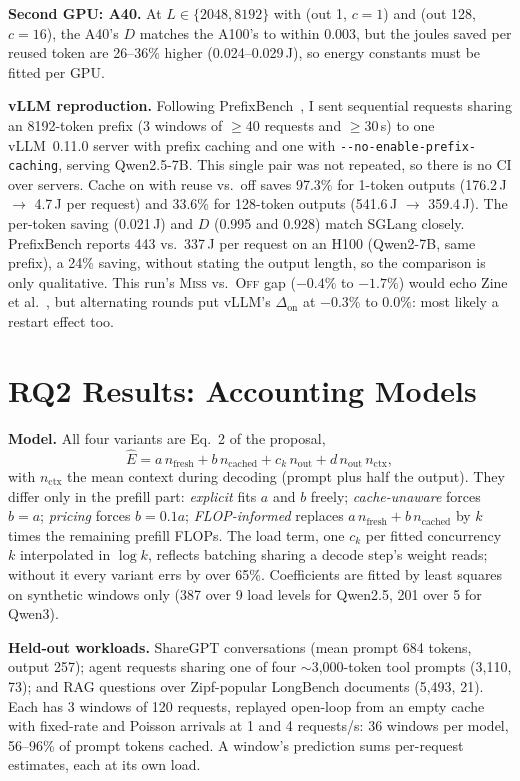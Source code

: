 \documentclass[conference]{IEEEtran}
\begin{document}
\textbf{Second GPU: A40.} At $L\in\{2048, 8192\}$ with (out 1, $c{=}1$) and (out 128, $c{=}16$), the A40's $D$ matches the A100's to within 0.003, but the joules saved per reused token are 26--36\% higher (0.024--0.029\,J), so energy constants must be fitted per GPU.

\textbf{vLLM reproduction.} Following PrefixBench~\cite{prefixbench}, I sent sequential requests sharing an 8192-token prefix (3 windows of $\ge$40 requests and $\ge$30\,s) to one vLLM~0.11.0 server with prefix caching and one with \texttt{-{}-no-enable-prefix-caching}, serving Qwen2.5-7B. This single pair was not repeated, so there is no CI over servers. Cache on with reuse vs.\ off saves 97.3\% for 1-token outputs (176.2\,J $\to$ 4.7\,J per request) and 33.6\% for 128-token outputs (541.6\,J $\to$ 359.4\,J). The per-token saving (0.021\,J) and $D$ (0.995 and 0.928) match SGLang closely. PrefixBench reports 443 vs.\ 337\,J per request on an H100 (Qwen2-7B, same prefix), a 24\% saving, without stating the output length, so the comparison is only qualitative. This run's \textsc{Miss} vs.\ \textsc{Off} gap ($-0.4\%$ to $-1.7\%$) would echo Zine et al.~\cite{zine}, but alternating rounds put vLLM's $\Delta_{\text{on}}$ at $-0.3\%$ to $0.0\%$: most likely a restart effect too.

\section{RQ2 Results: Accounting Models}
\label{sec:rq2}
\textbf{Model.} All four variants are Eq.~2 of the proposal,
\begin{equation}
\hat E = a\,n_{\text{fresh}} + b\,n_{\text{cached}} + c_k\,n_{\text{out}} + d\,n_{\text{out}}\,n_{\text{ctx}},
\end{equation}
with $n_{\text{ctx}}$ the mean context during decoding (prompt plus half the output). They differ only in the prefill part: \emph{explicit} fits $a$ and $b$ freely; \emph{cache-unaware} forces $b=a$; \emph{pricing} forces $b=0.1a$; \emph{FLOP-informed} replaces $a\,n_{\text{fresh}}+b\,n_{\text{cached}}$ by $k$ times the remaining prefill FLOPs. The load term, one $c_k$ per fitted concurrency $k$ interpolated in $\log k$, reflects batching sharing a decode step's weight reads; without it every variant errs by over 65\%. Coefficients are fitted by least squares on synthetic windows only (387 over 9 load levels for Qwen2.5, 201 over 5 for Qwen3).

\textbf{Held-out workloads.} ShareGPT conversations (mean prompt 684 tokens, output 257); agent requests sharing one of four $\sim$3{,}000-token tool prompts (3{,}110, 73); and RAG questions over Zipf-popular LongBench documents (5{,}493, 21). Each has 3 windows of 120 requests, replayed open-loop from an empty cache with fixed-rate and Poisson arrivals at 1 and 4 requests/s: 36 windows per model, 56--96\% of prompt tokens cached. A window's prediction sums per-request estimates, each at its own load.
\end{document}
